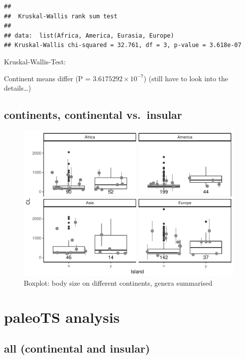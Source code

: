 \documentclass[]{article}
\begin{document}
\begin{verbatim}
## 
##  Kruskal-Wallis rank sum test
## 
## data:  list(Africa, America, Eurasia, Europe)
## Kruskal-Wallis chi-squared = 32.761, df = 3, p-value = 3.618e-07
\end{verbatim}

Kruskal-Wallis-Test:

Continent means differ (P = \(3.6175292\times 10^{-7}\)) (still have to
look into the details\ldots{})

\newpage

\subsection{continents, continental
vs.~insular}\label{continents-continental-vs.insular}

\begin{figure}[htbp]
\centering
\includegraphics{MA_JJ_files/figure-latex/Boxplot body size split into continents, continental vs. insular-1.pdf}
\caption{Boxplot: body size on different continents, genera summarised}
\end{figure}

\newpage

\section{paleoTS analysis}\label{paleots-analysis}

\subsection{all (continental and
insular)}\label{all-continental-and-insular}
\end{document}
